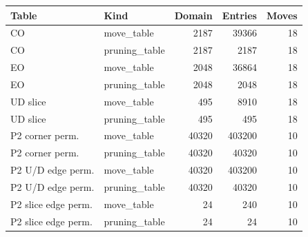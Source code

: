 {\small
\begin{tabular}{L{0.27\textwidth}L{0.18\textwidth}rrr}
\hline
Table & Kind & Domain & Entries & Moves \\
\hline
CO & move\_table & 2187 & 39366 & 18 \\
CO & pruning\_table & 2187 & 2187 & 18 \\
EO & move\_table & 2048 & 36864 & 18 \\
EO & pruning\_table & 2048 & 2048 & 18 \\
UD slice & move\_table & 495 & 8910 & 18 \\
UD slice & pruning\_table & 495 & 495 & 18 \\
P2 corner perm. & move\_table & 40320 & 403200 & 10 \\
P2 corner perm. & pruning\_table & 40320 & 40320 & 10 \\
P2 U/D edge perm. & move\_table & 40320 & 403200 & 10 \\
P2 U/D edge perm. & pruning\_table & 40320 & 40320 & 10 \\
P2 slice edge perm. & move\_table & 24 & 240 & 10 \\
P2 slice edge perm. & pruning\_table & 24 & 24 & 10 \\
\hline
\end{tabular}
}
